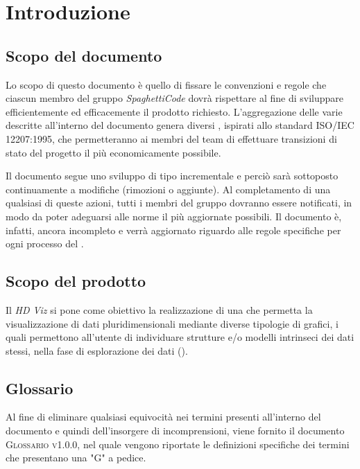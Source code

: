 \section{Introduzione}
\label{sec:introduzione}

\subsection{Scopo del documento}
Lo scopo di questo documento è quello di fissare le convenzioni e regole che ciascun membro del gruppo 
\emph{SpaghettiCode} dovrà rispettare al fine di sviluppare efficientemente ed efficacemente il prodotto richiesto. %
L'aggregazione delle varie  descritte all'interno del documento genera diversi 
, ispirati allo standard \textsc{ISO/IEC 12207:1995}, che permetteranno ai membri del team di effettuare transizioni di stato del progetto il più economicamente possibile. 

Il documento segue uno sviluppo di tipo incrementale e perciò sarà sottoposto continuamente a modifiche (rimozioni o aggiunte). Al completamento di 
una qualsiasi di queste azioni, tutti i membri del gruppo dovranno essere notificati, in modo da poter adeguarsi alle norme il più aggiornate 
possibili. Il documento è, infatti, ancora incompleto e verrà aggiornato riguardo alle regole specifiche per ogni processo del .

\subsection{Scopo del prodotto}
Il  \emph{HD Viz} si pone come obiettivo la realizzazione di una  che 
permetta la visualizzazione di dati pluridimensionali mediante diverse tipologie di grafici, i quali permettono 
all'utente di individuare strutture e/o modelli intrinseci dei dati stessi, nella fase di esplorazione dei dati 
().

\subsection{Glossario}
Al fine di eliminare qualsiasi equivocità nei termini presenti all'interno del documento e quindi dell'insorgere di 
incomprensioni, viene fornito il documento \textsc{Glossario v1.0.0}, nel quale vengono riportate le definizioni 
specifiche dei termini che presentano una "G" a pedice.

